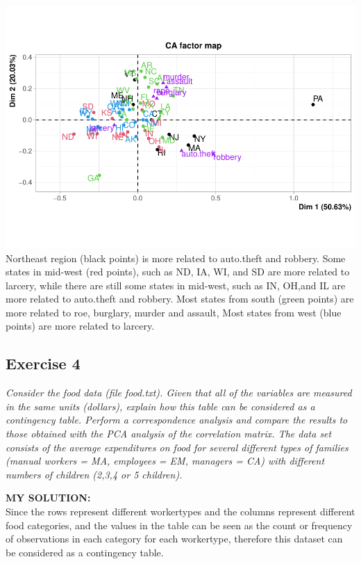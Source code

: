 \documentclass[
]{article}
\begin{document}
\includegraphics{HUDM6122-Homework_08-Chenguang-Pan_files/figure-latex/unnamed-chunk-8-1.pdf}
Northeast region (black points) is more related to auto.theft and
robbery. Some states in mid-west (red points), such as ND, IA, WI, and
SD are more related to larcery, while there are still some states in
mid-west, such as IN, OH,and IL are more related to auto.theft and
robbery. Most states from south (green points) are more related to roe,
burglary, murder and assault, Most states from west (blue points) are
more related to larcery.

\hypertarget{exercise-4}{%
\subsection{Exercise 4}\label{exercise-4}}

\emph{Consider the food data (file food.txt). Given that all of the
variables are measured in the same units (dollars), explain how this
table can be considered as a contingency table. Perform a correspondence
analysis and compare the results to those obtained with the PCA analysis
of the correlation matrix. The data set consists of the average
expenditures on food for several different types of families (manual
workers = MA, employees = EM, managers = CA) with different numbers of
children (2,3,4 or 5 children).}

\textbf{MY SOLUTION:}\\
Since the rows represent different workertypes and the columns represent
different food categories, and the values in the table can be seen as
the count or frequency of observations in each category for each
workertype, therefore this dataset can be considered as a contingency
table.
\end{document}

